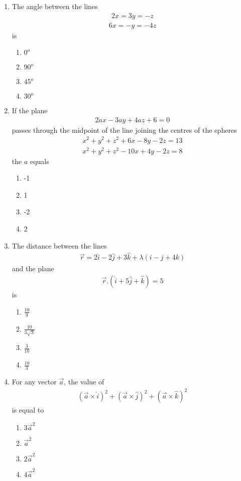 \begin{enumerate}[label=\arabic*.,ref=\thesubsection.\theenumi]
\item The angle between the lines
\begin{align*}
2x=3y=-z
\end{align*}
\begin{align*}
6x=-y=-4z
\end{align*}
is
\begin{enumerate}
\item $0^{o}$
\item $90^{o}$
\item $45^{o}$
\item $30^{o}$
\end{enumerate}

\item If the plane
\begin{align*}
2ax-3ay+4az+6=0
\end{align*}
passes through the midpoint of the line joining the centres of the spheres
\begin{align}
x^2+y^2+z^2+6x-8y-2z=13
\end{align}
\begin{align}
x^2+y^2+z^2-10x+4y-2z=8
\end{align}
the $a$ equals
\begin{enumerate}
\item -1
\item 1
\item -2
\item 2
\end{enumerate}

\item The distance between the lines
\begin{align*}
\overrightarrow{r}=2\hat{i}-2\hat{j}+3\hat{k}+\lambda(i-j+4k)
\end{align*}
and the plane
\begin{align*}
\overrightarrow{r}.(\hat{i}+5\hat{j}+\hat{k})=5
\end{align*}
is
\begin{enumerate}
\item $\frac{10}{9}$
\item $\frac{10}{3\sqrt{3}}$
\item $\frac{3}{10}$
\item $\frac{10}{3}$
\end{enumerate}

\item For any vector $\overrightarrow{a}$, the value of 
\begin{align*}
(\overrightarrow{a} \times \hat{i})^{2} + (\overrightarrow{a} \times \hat{j})^{2} + (\overrightarrow{a} \times \hat{k})^{2}
\end{align*}
is equal to
\begin{enumerate}
\item $3\overrightarrow{a}^{2}$
\item $\overrightarrow{a}^{2}$
\item $2\overrightarrow{a}^{2}$
\item $4\overrightarrow{a}^{2}$
\end{enumerate}


\end{enumerate}
